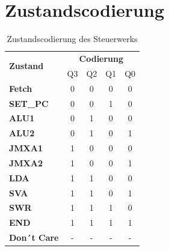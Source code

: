 \section{Zustandscodierung}
\label{sec:Zustandscodierung}

\begin{table} [H]
    \centering
    \begin{tabular}{|l|c|c|c|c|}
        \hline
        \multirow{2}{*}{\textbf{Zustand}} & \multicolumn{4}{c}{\textbf{Codierung}}                \\

                                          & Q3                                     & Q2 & Q1 & Q0 \\
        \hline
        \textbf{Fetch}                    & 0                                      & 0  & 0  & 0  \\
        \hline
        \textbf{SET\_PC}                  & 0                                      & 0  & 1  & 0  \\
        \hline
        \textbf{ALU1}                     & 0                                      & 1  & 0  & 0  \\
        \hline
        \textbf{ALU2}                     & 0                                      & 1  & 0  & 1  \\
        \hline
        \textbf{JMXA1}                    & 1                                      & 0  & 0  & 0  \\
        \hline
        \textbf{JMXA2}                    & 1                                      & 0  & 0  & 1  \\
        \hline
        \textbf{LDA}                      & 1                                      & 1  & 0  & 0  \\
        \hline
        \textbf{SVA}                      & 1                                      & 1  & 0  & 1  \\
        \hline
        \textbf{SWR}                      & 1                                      & 1  & 1  & 0  \\
        \hline
        \textbf{END}                      & 1                                      & 1  & 1  & 1  \\
        \hline
        \textbf{Don´t Care}               & -                                      & -  & -  & -  \\
        \hline
    \end{tabular}
    \caption{Zustandscodierung des Steuerwerks}
    \label{tab:Zustandscodierung}
\end{table}

